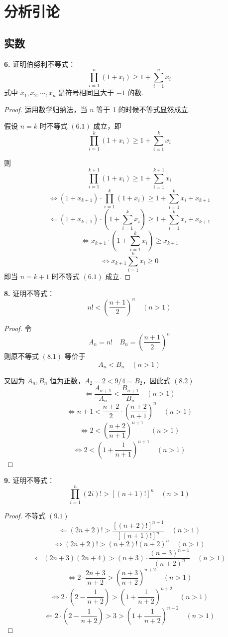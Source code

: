 \section{分析引论}
\subsection{实数}
\textbf{6.} 证明伯努利不等式：
\[\prod_{i=1}^{n} (1 + x_i) \geqslant 1 + \sum_{i=1}^{n} x_i \tag{6.1}\]
式中 $x_1, x_2, \cdots, x_n$ 是符号相同且大于 $-1$ 的数.
\begin{proof}
    运用数学归纳法，当 $n$ 等于 1 的时候不等式显然成立.

    假设 $n = k$ 时不等式 $(6.1)$ 成立，即
    \[\prod_{i=1}^{k} (1+x_i) \geqslant 1 + \sum_{i=1}^{k} x_i \tag{6.2}\]

    则
    \[\prod_{i=1}^{k+1} (1+x_i) \geqslant 1 + \sum_{i=1}^{k+1} x_i \tag{6.3}\]
    \[\Leftrightarrow (1 + x_{k+1}) \cdot \prod_{i=1}^{k}(1+x_i) \geqslant 1 + \sum_{i=1}^{k}x_i + x_{k+1}\]
    \[\Leftarrow (1 + x_{k+1}) \cdot \left(1 + \sum_{i=1}^{k}x_i\right) \geqslant 1 + \sum_{i=1}^{k}x_i + x_{k+1}\]
    \[\Leftrightarrow x_{k+1} \cdot \left(1 + \sum_{i=1}^{k}x_i\right) \geqslant x_{k+1}\]
    \[\Leftrightarrow x_{k+1}\sum_{i=1}^{k}x_i \geqslant 0 \tag{6.4}\]
    即当 $n = k+1$ 时不等式 $(6.1)$ 成立.
\end{proof}\vspace{9pt}

\textbf{8.} 证明不等式：
\[n! < \left(\frac{n+1}{2}\right)^n \quad (n > 1) \tag{8.1}\]
\begin{proof}
    令
    \[A_n = n! \quad B_n = \left(\frac{n+1}{2}\right)^n\]
    则原不等式 $(8.1)$ 等价于
    \[A_n < B_n \quad (n>1) \tag{8.2}\]

    又因为 $A_n, B_n$ 恒为正数，$A_2 = 2 < 9/4 = B_2$，因此式 $(8.2)$
    \[\Leftarrow \frac{A_{n+1}}{A_n} < \frac{B_{n+1}}{B_n} \quad (n>1) \tag{8.3}\]
    \[\Leftrightarrow n+1 < \frac{n+2}{2} \cdot \left(\frac{n+2}{n+1}\right)^n \quad (n>1)\]
    \[\Leftrightarrow 2 < \left(\frac{n+2}{n+1}\right)^{n+1} \quad (n>1)\]
    \[\Leftrightarrow 2 < \left(1 + \frac{1}{n+1}\right)^{n+1} \quad (n>1) \tag{8.4}\]
\end{proof}\vspace{9pt}

\textbf{9.} 证明不等式：
\[\prod_{i=1}^{n}(2i)! > [(n+1)!]^n \quad (n>1) \tag{9.1}\]
\begin{proof}
    不等式 $(9.1)$
    \[\Leftarrow (2n+2)! > \frac{[(n+2)!]^{n+1}}{[(n+1)!]^n} \quad (n>1) \tag{9.2}\]
    \[\Leftrightarrow (2n+2)! > (n+2)!(n+2)^n \quad (n>1)\]
    \[\Leftarrow (2n+3)(2n+4) > (n+3) \cdot \frac{(n+3)^{n+1}}{(n+2)^n} \quad (n>1) \tag{9.3}\]
    \[\Leftrightarrow 2 \cdot \frac{2n+3}{n+2} > \left(\frac{n+3}{n+2}\right)^{n+2} \quad (n>1)\]
    \[\Leftrightarrow 2 \cdot \left(2 - \frac{1}{n+2}\right) > \left(1 + \frac{1}{n+2}\right)^{n+2} \quad (n>1)\]
    \[\Leftarrow 2 \cdot \left(2 - \frac{1}{n+2}\right) > 3 > \left(1 + \frac{1}{n+2}\right)^{n+2} \quad (n>1) \tag{9.4}\]
\end{proof}\vspace{9pt}

